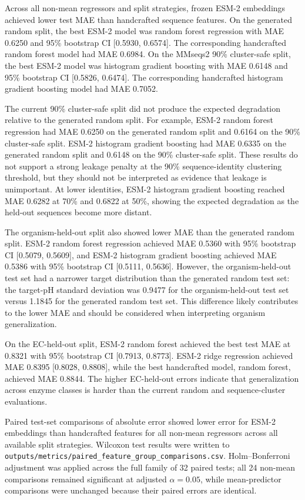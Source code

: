 Across all non-mean regressors and split strategies, frozen ESM-2 embeddings achieved lower test MAE than handcrafted sequence features. On the generated random split, the best ESM-2 model was random forest regression with MAE 0.6250 and 95\% bootstrap CI [0.5930, 0.6574]. The corresponding handcrafted random forest model had MAE 0.6984. On the MMseqs2 90\% cluster-safe split, the best ESM-2 model was histogram gradient boosting with MAE 0.6148 and 95\% bootstrap CI [0.5826, 0.6474]. The corresponding handcrafted histogram gradient boosting model had MAE 0.7052.

The current 90\% cluster-safe split did not produce the expected degradation relative to the generated random split. For example, ESM-2 random forest regression had MAE 0.6250 on the generated random split and 0.6164 on the 90\% cluster-safe split. ESM-2 histogram gradient boosting had MAE 0.6335 on the generated random split and 0.6148 on the 90\% cluster-safe split. These results do not support a strong leakage penalty at the 90\% sequence-identity clustering threshold, but they should not be interpreted as evidence that leakage is unimportant. At lower identities, ESM-2 histogram gradient boosting reached MAE 0.6282 at 70\% and 0.6822 at 50\%, showing the expected degradation as the held-out sequences become more distant.

The organism-held-out split also showed lower MAE than the generated random split. ESM-2 random forest regression achieved MAE 0.5360 with 95\% bootstrap CI [0.5079, 0.5609], and ESM-2 histogram gradient boosting achieved MAE 0.5386 with 95\% bootstrap CI [0.5111, 0.5636]. However, the organism-held-out test set had a narrower target distribution than the generated random test set: the target-pH standard deviation was 0.9477 for the organism-held-out test set versus 1.1845 for the generated random test set. This difference likely contributes to the lower MAE and should be considered when interpreting organism generalization.

On the EC-held-out split, ESM-2 random forest achieved the best test MAE at 0.8321 with 95\% bootstrap CI [0.7913, 0.8773]. ESM-2 ridge regression achieved MAE 0.8395 [0.8028, 0.8808], while the best handcrafted model, random forest, achieved MAE 0.8844. The higher EC-held-out errors indicate that generalization across enzyme classes is harder than the current random and sequence-cluster evaluations.

Paired test-set comparisons of absolute error showed lower error for ESM-2 embeddings than handcrafted features for all non-mean regressors across all available split strategies. Wilcoxon test results were written to \texttt{outputs/metrics/paired\_feature\_group\_comparisons.csv}. Holm--Bonferroni adjustment was applied across the full family of 32 paired tests; all 24 non-mean comparisons remained significant at adjusted \(\alpha=0.05\), while mean-predictor comparisons were unchanged because their paired errors are identical.

